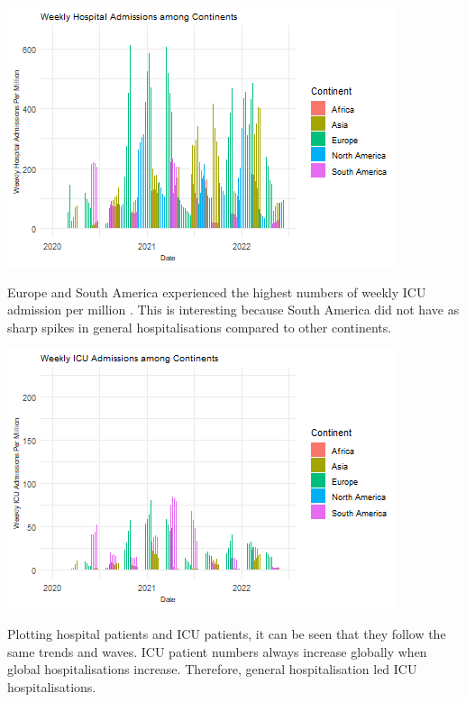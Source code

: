 \documentclass[11pt,preprint, authoryear]{elsarticle}
\let\origfigure\figure
\let\endorigfigure\endfigure
\renewenvironment{figure}[1][2] {
    \expandafter\origfigure\expandafter[H]
} {
    \endorigfigure
}
\numberwithin{equation}{section}
\numberwithin{figure}{section}
\numberwithin{table}{section}
\begin{document}
\begin{figure}[H]

{\centering \includegraphics{Q1_files/figure-latex/Figure4-1} 

}

\caption{Hospital Admissions \label{Figure4}}\label{fig:Figure4}
\end{figure}

Europe and South America experienced the highest numbers of weekly ICU
admission per million . This is interesting because South America did
not have as sharp spikes in general hospitalisations compared to other
continents.

\begin{figure}[H]

{\centering \includegraphics{Q1_files/figure-latex/Figure5-1} 

}

\caption{Hospital Admissions \label{Figure5}}\label{fig:Figure5}
\end{figure}

Plotting hospital patients and ICU patients, it can be seen that they
follow the same trends and waves. ICU patient numbers always increase
globally when global hospitalisations increase. Therefore, general
hospitalisation led ICU hospitalisations.
\end{document}
